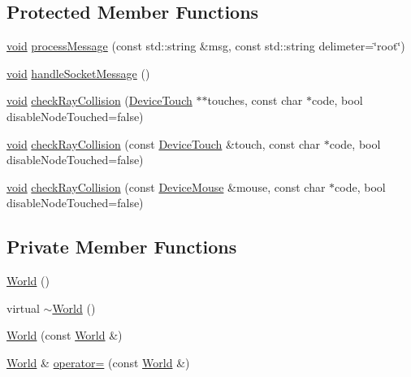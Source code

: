 \subsection*{Protected Member Functions}
\begin{DoxyCompactItemize}
\item 
\mbox{\hyperlink{_thread_8h_af1e856da2e658414cb2456cb6f7ebc66}{void}} \mbox{\hyperlink{classnjli_1_1_world_a4118fbcbb82b872369b235bbc7cde67f}{process\+Message}} (const std\+::string \&msg, const std\+::string delimeter=\char`\"{}root\char`\"{})
\item 
\mbox{\hyperlink{_thread_8h_af1e856da2e658414cb2456cb6f7ebc66}{void}} \mbox{\hyperlink{classnjli_1_1_world_a322956de68eb15d43bfb39083942edee}{handle\+Socket\+Message}} ()
\item 
\mbox{\hyperlink{_thread_8h_af1e856da2e658414cb2456cb6f7ebc66}{void}} \mbox{\hyperlink{classnjli_1_1_world_a9e884bc811dcdf6821f2d5a2edccf669}{check\+Ray\+Collision}} (\mbox{\hyperlink{classnjli_1_1_device_touch}{Device\+Touch}} $\ast$$\ast$touches, const char $\ast$code, bool disable\+Node\+Touched=false)
\item 
\mbox{\hyperlink{_thread_8h_af1e856da2e658414cb2456cb6f7ebc66}{void}} \mbox{\hyperlink{classnjli_1_1_world_a3e3cfdf16d875d3fc64c7428c07d23d7}{check\+Ray\+Collision}} (const \mbox{\hyperlink{classnjli_1_1_device_touch}{Device\+Touch}} \&touch, const char $\ast$code, bool disable\+Node\+Touched=false)
\item 
\mbox{\hyperlink{_thread_8h_af1e856da2e658414cb2456cb6f7ebc66}{void}} \mbox{\hyperlink{classnjli_1_1_world_ae023b659a2be3ea9dd38ff1fdef93bd6}{check\+Ray\+Collision}} (const \mbox{\hyperlink{classnjli_1_1_device_mouse}{Device\+Mouse}} \&mouse, const char $\ast$code, bool disable\+Node\+Touched=false)
\end{DoxyCompactItemize}
\subsection*{Private Member Functions}
\begin{DoxyCompactItemize}
\item 
\mbox{\hyperlink{classnjli_1_1_world_af01e96219aea73e611ba28179b3532ed}{World}} ()
\item 
virtual \mbox{\hyperlink{classnjli_1_1_world_aaf74d0ac73e1bf62d7b26bf7fdb6b5cd}{$\sim$\+World}} ()
\item 
\mbox{\hyperlink{classnjli_1_1_world_abf9c0b24c17244baf76d760e81974cfe}{World}} (const \mbox{\hyperlink{classnjli_1_1_world}{World}} \&)
\item 
\mbox{\hyperlink{classnjli_1_1_world}{World}} \& \mbox{\hyperlink{classnjli_1_1_world_a2fe83dc2d899a91ef21ac20220e2ada4}{operator=}} (const \mbox{\hyperlink{classnjli_1_1_world}{World}} \&)
\end{DoxyCompactItemize}
